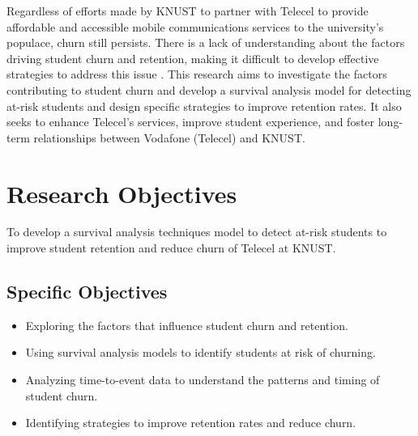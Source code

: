 \documentclass[doublespacing]{report} %
\begin{document}
Regardless of efforts made by KNUST to partner with Telecel to provide affordable and accessible mobile communications services to the university’s populace, churn still persists. There is a lack of understanding about the factors driving student churn and retention, making it difficult to develop effective strategies to address this issue \cite{kapur2018}. This research aims to investigate the factors contributing to student churn and develop a survival analysis model for detecting at-risk students and design specific strategies to improve retention rates. It also seeks to enhance Telecel’s services, improve student experience, and foster long-term relationships between Vodafone (Telecel) and KNUST.

\section{Research Objectives}

To develop a survival analysis techniques model to detect at-risk students to improve student retention and reduce churn of Telecel at KNUST.

\subsection{Specific Objectives}
\begin{itemize}
    \item Exploring the factors that influence student churn and retention.
    \item Using survival analysis models to identify students at risk of churning.
    \item Analyzing time-to-event data to understand the patterns and timing of student churn.
    \item Identifying strategies to improve retention rates and reduce churn.
\end{itemize}
\end{document}
